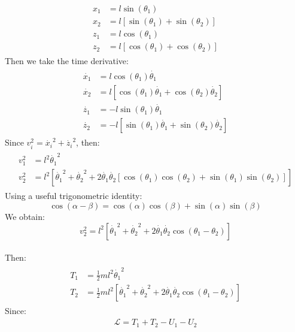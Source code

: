 \documentclass{article}
\begin{document}
\begin{align*}
\begin{split}
    x_1 & = l\sin(\theta_1) \\
    x_2 & = l[\sin(\theta_1)+\sin(\theta_2)] \\
    z_1 & = l\cos(\theta_1) \\
    z_2 & = l[\cos(\theta_1)+\cos(\theta_2)]
\end{split}
\end{align*}
Then we take the time derivative:
\begin{align*}
\begin{split}
    \dot{x_1} & = l\cos(\theta_1)\dot{\theta_1} \\
    \dot{x_2} & = l[\cos(\theta_1)\dot{\theta_1} + \cos(\theta_2)\dot{\theta_2}] \\
    \dot{z_1} & = -l\sin(\theta_1)\dot{\theta_1} \\
    \dot{z_2} & = -l[\sin(\theta_1)\dot{\theta_1} + \sin(\theta_2)\dot{\theta_2}]
\end{split}
\end{align*}
Since $v_i^2 = \dot{x_i}^2 + \dot{z_i}^2$, then:
\begin{align*}
\begin{split}
    v_1^2 & = l^2\dot{\theta_1}^2 \\
    v_2^2 & = l^2[\dot{\theta_1}^2 + \dot{\theta_2}^2 + 2\dot{\theta_1}\dot{\theta_2}[\cos(\theta_1)\cos(\theta_2) + \sin(\theta_1)\sin(\theta_2)]]
\end{split}
\end{align*}
Using a useful trigonometric identity:
\begin{equation*}
    \cos(\alpha - \beta) = \cos(\alpha)\cos(\beta) + \sin(\alpha)\sin(\beta)
\end{equation*}
We obtain:
\begin{equation*}
        v_2^2 = l^2[\dot{\theta_1}^2 + \dot{\theta_2}^2 + 2\dot{\theta_1}\dot{\theta_2}\cos(\theta_1 - \theta_2)]
\end{equation*}
\\Then:
\begin{align*}
\begin{split}
    T_1 & = \frac{1}{2}ml^2\dot{\theta_1}^2 \\
    T_2 & = \frac{1}{2}ml^2[\dot{\theta_1}^2 + \dot{\theta_2}^2 + 2\dot{\theta_1}\dot{\theta_2}\cos(\theta_1 - \theta_2)]
\end{split}
\end{align*}
Since:
\begin{align*}
    \mathcal{L} = T_1 + T_2 - U_1 - U_2
\end{align*}
\end{document}
